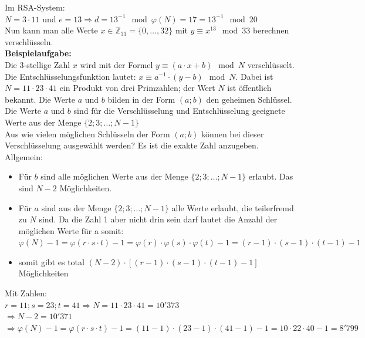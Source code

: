 \documentclass[12pt]{scrartcl}
\begin{document}
Im RSA-System: \\
$N = 3 \cdot 11$ und $e = 13 \Rightarrow d = 13^{-1} \mod \varphi(N) = 17 = 13^{-1} \mod 20$ \\

Nun kann man alle Werte $x \in \mathbb{Z}_{33} = \{0, \dots, 32\}$ mit $y \equiv x^{13} \mod 33$ berechnen
verschlüsseln.\\

\vspace{0.5cm}
\textbf{Beispielaufgabe:}\\
Die 3-stellige Zahl $x$ wird mit der Formel $y \equiv (a \cdot x + b ) \mod N$ verschlüsselt. Die 
Entschlüsselungsfunktion lautet: $x \equiv a^{-1} \cdot (y - b) \mod N$. Dabei ist $N = 11 \cdot 23 \cdot 41$ 
ein Produkt von drei Primzahlen; der Wert $N$ ist öffentlich bekannt. Die Werte $a$ und $b$ bilden in der Form $(a; b)$ 
den geheimen Schlüssel. Die Werte $a$ und $b$ sind für die Verschlüsselung und Entschlüsselung geeignete Werte aus
der Menge $\{2; 3; \dots ; N - 1\}$\\

Aus wie vielen möglichen Schlüsseln der Form $(a; b)$ können bei dieser Verschlüsselung ausgewählt werden? 
Es ist die exakte Zahl anzugeben.\\


\newpage
Allgemein:
\begin{itemize}
    \item Für $b$ sind alle möglichen Werte aus der Menge $\{2;3;\dots;N-1\}$ erlaubt. Das sind $N-2$ Möglichkeiten.
    \item Für $a$ sind aus der Menge $\{2;3;\dots;N-1\}$ alle Werte erlaubt, die teilerfremd zu $N$ sind. Da die Zahl 1
            aber nicht drin sein darf lautet die Anzahl der möglichen Werte für a somit:
            $\varphi(N) - 1 = \varphi(r \cdot s \cdot t) - 1 = \varphi(r) \cdot \varphi(s) \cdot \varphi(t) - 1 = (r-1) \cdot (s-1) \cdot (t-1) - 1$
    \item somit gibt es total $(N-2) \cdot [(r-1) \cdot (s-1) \cdot (t-1) - 1]$ Möglichkeiten
\end{itemize}


\vspace{0.5cm}
Mit Zahlen:\\
$r = 11; s = 23; t = 41 \Rightarrow N = 11 \cdot 23 \cdot 41 = 10'373$\\

$\Rightarrow N -2 = 10'371$\\
$\Rightarrow \varphi(N) - 1 = \varphi(r \cdot s \cdot t) -1 = (11 - 1) \cdot (23 - 1) \cdot (41 - 1) - 1 = 10 \cdot 22 \cdot 40 - 1 = 8'799$\\
\end{document}
